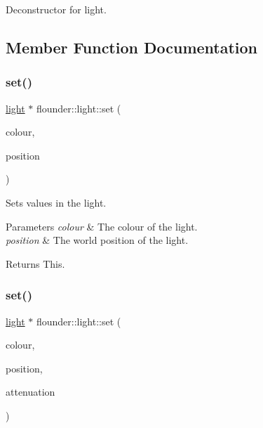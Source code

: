 Deconstructor for light. 



\subsection{Member Function Documentation}
\mbox{\label{classflounder_1_1light_ac01c16e7d4436d43205a33aa9662813a}} 
\subsubsection{\texorpdfstring{set()}{set()}\hspace{0.1cm}{\footnotesize\ttfamily [1/2]}}
{\footnotesize\ttfamily \hyperlink{classflounder_1_1light}{light} $\ast$ flounder\+::light\+::set (\begin{DoxyParamCaption}\item[{\hyperlink{classflounder_1_1colour}{colour} $\ast$}]{colour,  }\item[{\hyperlink{classflounder_1_1vector3}{vector3} $\ast$}]{position }\end{DoxyParamCaption})}



Sets values in the light. 


\begin{DoxyParams}{Parameters}
{\em colour} & The colour of the light. \\
\hline
{\em position} & The world position of the light. \\
\hline
\end{DoxyParams}
\begin{DoxyReturn}{Returns}
This. 
\end{DoxyReturn}
\mbox{\label{classflounder_1_1light_aa5f447bd799982f1d8012b09b25fd6ec}} 
\subsubsection{\texorpdfstring{set()}{set()}\hspace{0.1cm}{\footnotesize\ttfamily [2/2]}}
{\footnotesize\ttfamily \hyperlink{classflounder_1_1light}{light} $\ast$ flounder\+::light\+::set (\begin{DoxyParamCaption}\item[{\hyperlink{classflounder_1_1colour}{colour} $\ast$}]{colour,  }\item[{\hyperlink{classflounder_1_1vector3}{vector3} $\ast$}]{position,  }\item[{attenuation $\ast$}]{attenuation }\end{DoxyParamCaption})}



